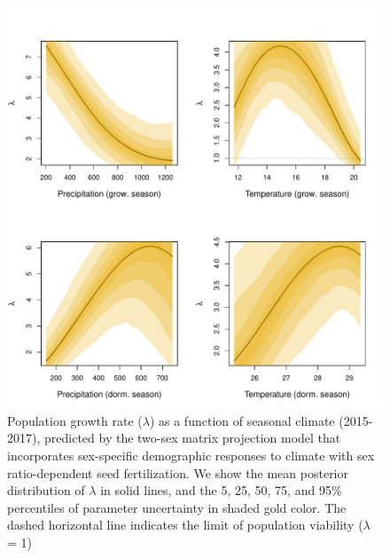 \documentclass[12pt]{article}
\begin{document}
\begin{figure}[H]
  \begin{center}
    \includegraphics[width=0.95\linewidth]{Figures/lambda_CI.pdf}
  \caption{Population growth rate ($\lambda$) as a function of seasonal climate (2015-2017), predicted by the two-sex matrix projection model that incorporates sex-specific demographic responses to climate with sex ratio-dependent seed fertilization.
We show the mean posterior distribution of $\lambda$ in solid lines, and the 5, 25, 50, 75, and 95\% percentiles of parameter uncertainty in shaded gold color.
The dashed horizontal line indicates the limit of population viability ($\lambda$ = 1)}
  \label{Sup:lambda2sex}
  \end{center}
\end{figure}
\end{document}
